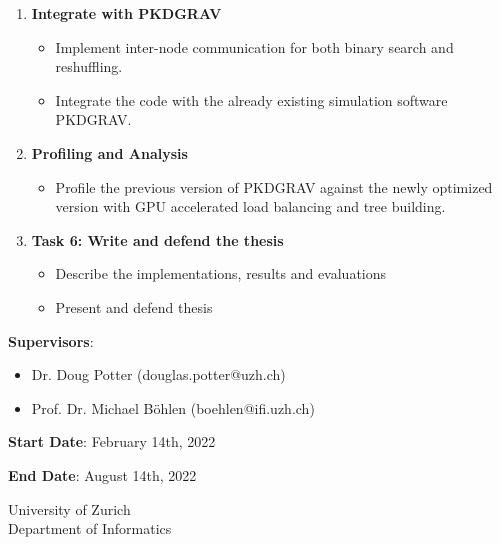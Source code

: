 \documentclass[english]{IFIletter}
\begin{document}
\begin{letter}
\begin{enumerate}
\begin{itemize}
  \end{itemize}
  
\item \textbf{Integrate with PKDGRAV}
    \begin{itemize}
    \item Implement inter-node communication for both binary search and reshuffling.
    \item Integrate the code with the already existing simulation software PKDGRAV.\cite{2017ComAC...4....2P}
\end{itemize}

\item \textbf{Profiling and Analysis}
\begin{itemize}
    \item Profile the previous version of PKDGRAV against the newly optimized version with GPU accelerated load balancing and tree building.
\end{itemize}




\item \textbf{Task 6: Write and defend the thesis}
  \begin{itemize}
  \item Describe the implementations, results and evaluations
  \item Present and defend thesis
  \end{itemize}
\end{enumerate}

\vspace{0.5cm}




\vspace{1cm}

\textbf{Supervisors}:
\begin{itemize}
\item Dr. Doug Potter (douglas.potter@uzh.ch)
\item Prof. Dr. Michael B\"ohlen (boehlen@ifi.uzh.ch)
\end{itemize}

\vspace{0.5cm}
\textbf{Start Date}: February 14th, 2022

\vspace{0.5cm}
\textbf{End Date}: August 14th, 2022

\vspace{2cm}
\closing{University of Zurich\\Department of Informatics}

\end{letter}
\end{document}

